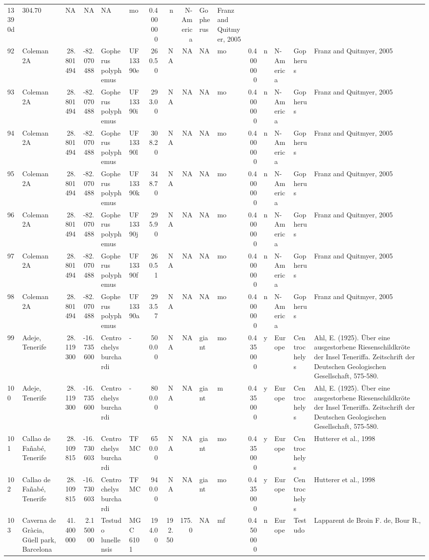 \documentclass[]{article}
\begin{document}
\begin{longtable}[]{@{}llrrllrrrllrllll@{}}
13390d & 304.70 & NA & NA & NA & mo & 0.400000 & n & N-America &
Gopherus & Franz and Quitmyer, 2005\tabularnewline
92 & Coleman 2A & 28.801494 & -82.070488 & Gopherus polyphemus &
UF13390e & 260.50 & NA & NA & NA & mo & 0.400000 & n & N-America &
Gopherus & Franz and Quitmyer, 2005\tabularnewline
93 & Coleman 2A & 28.801494 & -82.070488 & Gopherus polyphemus & UF
13390i & 293.00 & NA & NA & NA & mo & 0.400000 & n & N-America &
Gopherus & Franz and Quitmyer, 2005\tabularnewline
94 & Coleman 2A & 28.801494 & -82.070488 & Gopherus polyphemus & UF
13390l & 308.20 & NA & NA & NA & mo & 0.400000 & n & N-America &
Gopherus & Franz and Quitmyer, 2005\tabularnewline
95 & Coleman 2A & 28.801494 & -82.070488 & Gopherus polyphemus & UF
13390k & 348.70 & NA & NA & NA & mo & 0.400000 & n & N-America &
Gopherus & Franz and Quitmyer, 2005\tabularnewline
96 & Coleman 2A & 28.801494 & -82.070488 & Gopherus polyphemus & UF
13390j & 295.90 & NA & NA & NA & mo & 0.400000 & n & N-America &
Gopherus & Franz and Quitmyer, 2005\tabularnewline
97 & Coleman 2A & 28.801494 & -82.070488 & Gopherus polyphemus & UF
13390f & 260.51 & NA & NA & NA & mo & 0.400000 & n & N-America &
Gopherus & Franz and Quitmyer, 2005\tabularnewline
98 & Coleman 2A & 28.801494 & -82.070488 & Gopherus polyphemus & UF
13390a & 293.57 & NA & NA & NA & mo & 0.400000 & n & N-America &
Gopherus & Franz and Quitmyer, 2005\tabularnewline
99 & Adeje, Tenerife & 28.119300 & -16.735600 & Centrochelys burchardi &
- & 500.00 & NA & NA & giant & mo & 0.435000 & y & Europe & Centrochelys
& Ahl, E. (1925). Über eine ausgestorbene Riesenschildkröte der Insel
Teneriffa. Zeitschrift der Deutschen Geologischen Gesellschaft,
575-580.\tabularnewline
100 & Adeje, Tenerife & 28.119300 & -16.735600 & Centrochelys burchardi
& - & 800.00 & NA & NA & giant & m & 0.435000 & y & Europe &
Centrochelys & Ahl, E. (1925). Über eine ausgestorbene Riesenschildkröte
der Insel Teneriffa. Zeitschrift der Deutschen Geologischen
Gesellschaft, 575-580.\tabularnewline
101 & Callao de Fañabé, Tenerife & 28.109815 & -16.730603 & Centrochelys
burchardi & TFMC & 650.00 & NA & NA & giant & mo & 0.435000 & y & Europe
& Centrochelys & Hutterer et al., 1998\tabularnewline
102 & Callao de Fañabé, Tenerife & 28.109815 & -16.730603 & Centrochelys
burchardi & TFMC & 940.00 & NA & NA & giant & mo & 0.435000 & y & Europe
& Centrochelys & Hutterer et al., 1998\tabularnewline
103 & Caverna de Gràcia, Güell park, Barcelona & 41.400000 & 2.150000 &
Testudo lunellensis & MGC 6101 & 194.00 & 192.50 & 175.0 & NA & mf &
0.450000 & n & Europe & Testudo & Lapparent de Broin F. de, Bour R.,

\end{longtable}
\end{document}
